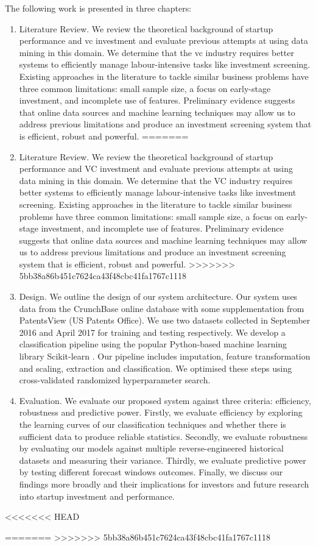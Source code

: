 \documentclass[../thesis/thesis.tex]{subfiles}
\begin{document}
The following work is presented in three chapters:

\begin{enumerate}

<<<<<<< HEAD
\item Literature Review. We review the theoretical background of startup performance and \gls{vc} investment and evaluate previous attempts at using data mining in this domain. We determine that the \gls{vc} industry requires better systems to efficiently manage labour-intensive tasks like investment screening. Existing approaches in the literature to tackle similar business problems have three common limitations: small sample size, a focus on early-stage investment, and incomplete use of features. Preliminary evidence suggests that online data sources and machine learning techniques may allow us to address previous limitations and produce an investment screening system that is efficient, robust and powerful.
=======
\item Literature Review. We review the theoretical background of startup performance and VC investment and evaluate previous attempts at using data mining in this domain. We determine that the VC industry requires better systems to efficiently manage labour-intensive tasks like investment screening. Existing approaches in the literature to tackle similar business problems have three common limitations: small sample size, a focus on early-stage investment, and incomplete use of features. Preliminary evidence suggests that online data sources and machine learning techniques may allow us to address previous limitations and produce an investment screening system that is efficient, robust and powerful.
>>>>>>> 5bb38a86b451c7624ca43f48cbc41fa1767c1118

\item Design. We outline the design of our system architecture. Our system uses data from the CrunchBase online database with some supplementation from PatentsView (US Patents Office). We use two datasets collected in September 2016 and April 2017 for training and testing respectively. We develop a classification pipeline using the popular Python-based machine learning library Scikit-learn \cite{pedregosa2011}. Our pipeline includes imputation,  feature transformation and scaling, extraction and classification. We optimised these steps using cross-validated randomized hyperparameter search.

\item Evaluation. We evaluate our proposed system against three criteria: efficiency, robustness and predictive power. Firstly, we evaluate efficiency by exploring the learning curves of our classification techniques and whether there is sufficient data to produce reliable statistics. Secondly, we evaluate robustness by evaluating our models against multiple reverse-engineered historical datasets and measuring their variance. Thirdly, we evaluate predictive power by testing different forecast windows outcomes. Finally, we discuss our findings more broadly and their implications for investors and future research into startup investment and performance.

\end{enumerate}

<<<<<<< HEAD

=======
>>>>>>> 5bb38a86b451c7624ca43f48cbc41fa1767c1118
\end{document}
